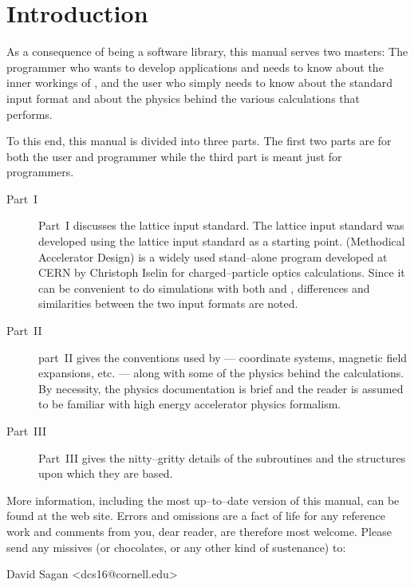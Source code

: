 \section*{Introduction}

As a consequence of \bmad being a software library, this manual serves
two masters: The programmer who wants to develop applications and
needs to know about the inner workings of \bmad, and the user who
simply needs to know about the \bmad standard input format and about
the physics behind the various calculations that \bmad performs.

To this end, this manual is divided into three parts. The first two
parts are for both the user and programmer while the third part is
meant just for programmers. 
  \begin{description}
  \item[Part~I] \Newline
Part~I discusses the \bmad lattice input standard.  The \bmad lattice
input standard was developed using the \mad lattice input standard as
a starting point\cite{b:maduser,b:madphysics}. \mad (Methodical
Accelerator Design) is a widely used stand--alone program developed at
CERN by Christoph Iselin for charged--particle optics
calculations. Since it can be convenient to do simulations with both
\mad and \bmad, differences and similarities between the two input
formats are noted.
  \item[Part~II] \Newline
part~II gives the conventions used by
\bmad --- coordinate systems, magnetic field expansions, etc. ---
along with some of the physics behind the calculations. By necessity,
the physics documentation is brief and the reader is assumed to be familiar
with high energy accelerator physics formalism. 
  \item[Part~III] \Newline
Part~III gives the nitty--gritty details of the \bmad
subroutines and the structures upon which they are based.
\end{description}

More information, including the most up--to--date version of this
manual, can be found at the \bmad web site\cite{b:bmad.web}.
Errors and omissions are a fact of life for any reference work and
comments from you, dear reader, are therefore most welcome. Please
send any missives (or chocolates, or any other kind of sustenance) to:
\begin{example}
  David Sagan <dcs16@cornell.edu>
\end{example}

